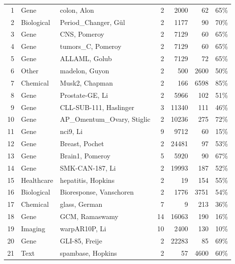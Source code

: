 \documentclass[preprint,12pt,authoryear]{elsarticle}
\begin{document}
{\begin{longtable}{@{}r p{1.9cm} p{6.7cm} r r r r@{}}
1 & Gene & colon, Alon \citeyearpar{alon1999broad} & 2 & 2000 & 62 & 65\% \\
2 & Biological & Period\_Changer, G{\"u}l \citeyearpar{period_changer_729} & 2 & 1177 & 90 & 70\% \\
3 & Gene & CNS, Pomeroy \citeyearpar{pomeroy2002prediction} & 2 & 7129 & 60 & 65\% \\
4 & Gene & tumors\_C, Pomeroy \citeyearpar{pomeroy2002prediction} & 2 & 7129 & 60 & 65\% \\
5 & Gene & ALLAML, Golub \citeyearpar{golub1999molecular} & 2 & 7129 & 72 & 65\% \\
6 & Other & madelon, Guyon \citeyearpar{guyon2004result} & 2 & 500 & 2600 & 50\% \\
7 & Chemical & Musk2, Chapman \citeyearpar{musk_(version_2)_75} & 2 & 166 & 6598 & 85\% \\
8 & Gene & Prostate-GE, Li \citeyearpar{li2017feature} & 2 & 5966 & 102 & 51\% \\
9 & Gene & CLL-SUB-111, Haslinger \citeyearpar{haslinger2004microarray} & 3 & 11340 & 111 & 46\% \\
10 & Gene & AP\_Omentum\_Ovary, Stiglic \citeyearpar{stiglic2010stability} & 2 & 10236 & 275 & 72\% \\
11 & Gene & nci9, Li \citeyearpar{li2017feature} & 9 & 9712 & 60 & 15\% \\
12 & Gene & Breast, Pochet \citeyearpar{pochet2004systematic} & 2 & 24481 & 97 & 53\% \\
13 & Gene & Brain1, Pomeroy \citeyearpar{pomeroy2002prediction} & 5 & 5920 & 90 & 67\% \\
14 & Gene & SMK-CAN-187, Li \citeyearpar{li2017feature} & 2 & 19993 & 187 & 52\% \\
15 & Healthcare & hepatitis, Hopkins \citeyearpar{hepatitis_46} & 2 & 19 & 154 & 55\% \\
16 & Biological & Bioresponse, Vanschoren \citeyearpar{vanschoren2014openml} & 2 & 1776 & 3751 & 54\% \\
17 & Chemical & glass, German \citeyearpar{glass_identification_42} & 7 & 9 & 213 & 36\% \\
18 & Gene & GCM, Ramaswamy \citeyearpar{ramaswamy2001multiclass} & 14 & 16063 & 190 & 16\% \\
19 & Imaging & warpAR10P, Li \citeyearpar{li2017feature} & 10 & 2400 & 130 & 10\% \\
20 & Gene & GLI-85, Freije \citeyearpar{freije2004gene} & 2 & 22283 & 85 & 69\% \\
21 & Text & spambase, Hopkins \citeyearpar{spambase_94} & 2 & 57 & 4600 & 60\% \\

\end{longtable}}
\end{document}
